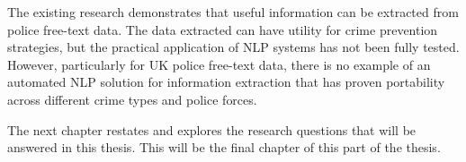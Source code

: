 The existing research demonstrates that useful information can be extracted from police free-text data. The data extracted can have utility for crime prevention strategies, but the practical application of NLP systems has not been fully tested. However, particularly for UK police free-text data, there is no example of an automated NLP solution for information extraction that has proven portability across different crime types and police forces.

The next chapter restates and explores the research questions that will be answered in this thesis. This will be the final chapter of this part of the thesis. 


